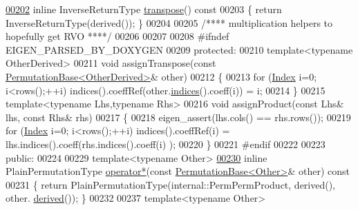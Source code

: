 \begin{DoxyCode}
\hyperlink{group___core___module_a05805e9f4182eec3f6632e1c765b5ffe}{00202}     \textcolor{keyword}{inline} InverseReturnType \hyperlink{group___core___module_a05805e9f4182eec3f6632e1c765b5ffe}{transpose}()\textcolor{keyword}{ const}
00203 \textcolor{keyword}{    }\{ \textcolor{keywordflow}{return} InverseReturnType(derived()); \}
00204 
00205     \textcolor{comment}{/**** multiplication helpers to hopefully get RVO ****/}
00206 
00207   
00208 \textcolor{preprocessor}{#ifndef EIGEN\_PARSED\_BY\_DOXYGEN}
00209   \textcolor{keyword}{protected}:
00210     \textcolor{keyword}{template}<\textcolor{keyword}{typename} OtherDerived>
00211     \textcolor{keywordtype}{void} assignTranspose(\textcolor{keyword}{const} \hyperlink{group___core___module_class_eigen_1_1_permutation_base}{PermutationBase<OtherDerived>}& other)
00212     \{
00213       \textcolor{keywordflow}{for} (\hyperlink{group___core___module_a554f30542cc2316add4b1ea0a492ff02}{Index} i=0; i<rows();++i) indices().coeffRef(other.\hyperlink{group___core___module_adec727546b6882ecaa57e76d084951c5}{indices}().coeff(i)) = i;
00214     \}
00215     \textcolor{keyword}{template}<\textcolor{keyword}{typename} Lhs,\textcolor{keyword}{typename} Rhs>
00216     \textcolor{keywordtype}{void} assignProduct(\textcolor{keyword}{const} Lhs& lhs, \textcolor{keyword}{const} Rhs& rhs)
00217     \{
00218       eigen\_assert(lhs.cols() == rhs.rows());
00219       \textcolor{keywordflow}{for} (\hyperlink{group___core___module_a554f30542cc2316add4b1ea0a492ff02}{Index} i=0; i<rows();++i) indices().coeffRef(i) = lhs.indices().coeff(rhs.indices().coeff(i)
      );
00220     \}
00221 \textcolor{preprocessor}{#endif}
00222 
00223   \textcolor{keyword}{public}:
00224 
00229     \textcolor{keyword}{template}<\textcolor{keyword}{typename} Other>
\hyperlink{group___core___module_ae81574e059f6b9b7de2ea747fd346a1b}{00230}     \textcolor{keyword}{inline} PlainPermutationType \hyperlink{group___core___module_ae81574e059f6b9b7de2ea747fd346a1b}{operator*}(\textcolor{keyword}{const} \hyperlink{group___core___module_class_eigen_1_1_permutation_base}{PermutationBase<Other>}& 
      other)\textcolor{keyword}{ const}
00231 \textcolor{keyword}{    }\{ \textcolor{keywordflow}{return} PlainPermutationType(internal::PermPermProduct, derived(), other.
      \hyperlink{group___core___module_a324b16961a11d2ecfd2d1b7dd7946545}{derived}()); \}
00232 
00237     \textcolor{keyword}{template}<\textcolor{keyword}{typename} Other>

\end{DoxyCode}

